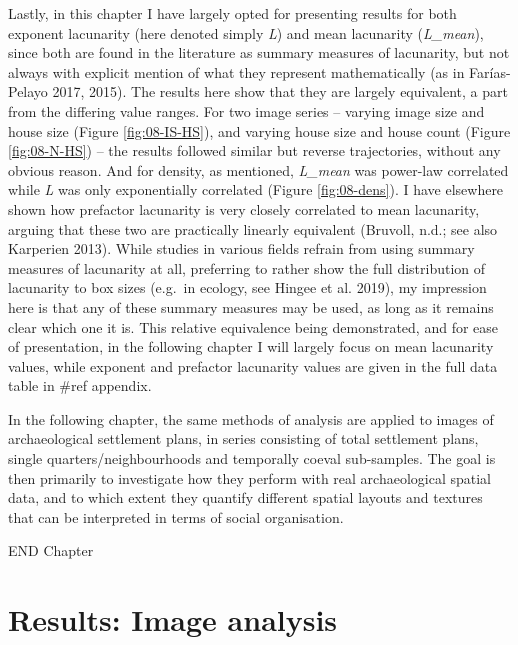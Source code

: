 \documentclass[
  12pt,
  a4paper, twoside]{book}
\begin{document}
Lastly, in this chapter I have largely opted for presenting results for both exponent lacunarity (here denoted simply \emph{L}) and mean lacunarity (\emph{L\_mean}), since both are found in the literature as summary measures of lacunarity, but not always with explicit mention of what they represent mathematically (as in Farías-Pelayo 2017, 2015). The results here show that they are largely equivalent, a part from the differing value ranges. For two image series -- varying image size and house size (Figure \ref{fig:08-IS-HS}), and varying house size and house count (Figure \ref{fig:08-N-HS}) -- the results followed similar but reverse trajectories, without any obvious reason. And for density, as mentioned, \emph{L\_mean} was power-law correlated while \emph{L} was only exponentially correlated (Figure \ref{fig:08-dens}). I have elsewhere shown how prefactor lacunarity is very closely correlated to mean lacunarity, arguing that these two are practically linearly equivalent (Bruvoll, n.d.; see also Karperien 2013). While studies in various fields refrain from using summary measures of lacunarity at all, preferring to rather show the full distribution of lacunarity to box sizes (e.g.~in ecology, see Hingee et al. 2019), my impression here is that any of these summary measures may be used, as long as it remains clear which one it is. This relative equivalence being demonstrated, and for ease of presentation, in the following chapter I will largely focus on mean lacunarity values, while exponent and prefactor lacunarity values are given in the full data table in \#ref appendix.

In the following chapter, the same methods of analysis are applied to images of archaeological settlement plans, in series consisting of total settlement plans, single quarters/neighbourhoods and temporally coeval sub-samples. The goal is then primarily to investigate how they perform with real archaeological spatial data, and to which extent they quantify different spatial layouts and textures that can be interpreted in terms of social organisation.

END Chapter

\hypertarget{images-results}{%
\chapter{Results: Image analysis}\label{images-results}}
\end{document}
